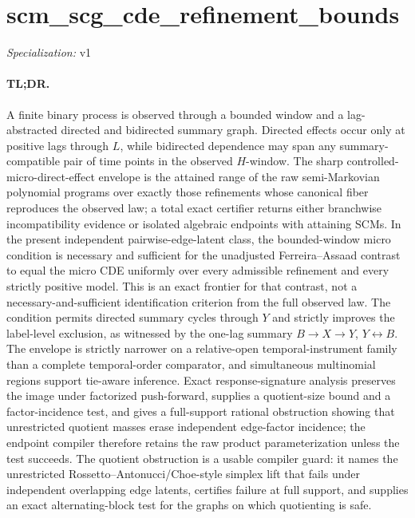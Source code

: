 \documentclass{article}
\begin{document}
\sloppy

\section*{scm\_\allowbreak{}scg\_\allowbreak{}cde\_\allowbreak{}refinement\_\allowbreak{}bounds}

\noindent\textit{Specialization:} v1\par

\paragraph{TL;DR.} A finite binary process is observed through a bounded window and a lag-abstracted directed and bidirected summary graph. Directed effects occur only at positive lags through \(L\), while bidirected dependence may span any summary-compatible pair of time points in the observed \(H\)-window. The sharp controlled-micro-direct-effect envelope is the attained range of the raw semi-Markovian polynomial programs over exactly those refinements whose canonical fiber reproduces the observed law; a total exact certifier returns either branchwise incompatibility evidence or isolated algebraic endpoints with attaining SCMs. In the present independent pairwise-edge-latent class, the bounded-window micro condition is necessary and sufficient for the unadjusted Ferreira--Assaad contrast to equal the micro CDE uniformly over every admissible refinement and every strictly positive model. This is an exact frontier for that contrast, not a necessary-and-sufficient identification criterion from the full observed law. The condition permits directed summary cycles through \(Y\) and strictly improves the label-level exclusion, as witnessed by the one-lag summary \(B\to X\to Y\), \(Y\leftrightarrow B\). The envelope is strictly narrower on a relative-open temporal-instrument family than a complete temporal-order comparator, and simultaneous multinomial regions support tie-aware inference. Exact response-signature analysis preserves the image under factorized push-forward, supplies a quotient-size bound and a factor-incidence test, and gives a full-support rational obstruction showing that unrestricted quotient masses erase independent edge-factor incidence; the endpoint compiler therefore retains the raw product parameterization unless the test succeeds. The quotient obstruction is a usable compiler guard: it names the unrestricted Rossetto--Antonucci/Choe-style simplex lift that fails under independent overlapping edge latents, certifies failure at full support, and supplies an exact alternating-block test for the graphs on which quotienting is safe.
\end{document}
